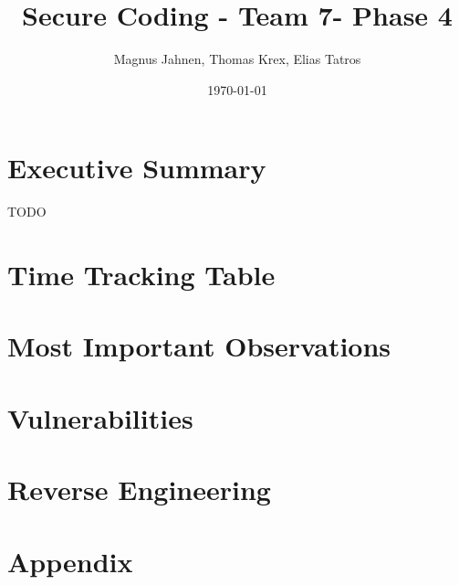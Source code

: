 \documentclass{report}
\title{Secure Coding - Team 7- Phase 4}
\author{Magnus Jahnen, Thomas Krex, Elias Tatros}
\date{\today}
\begin{document}
\maketitle

\part{Executive Summary}
TODO


\tableofcontents

\part{Time Tracking Table}


\part{Most Important Observations}


\part{Vulnerabilities}

\part{Reverse Engineering}



\part*{Appendix}
\appendix

\end{document}
